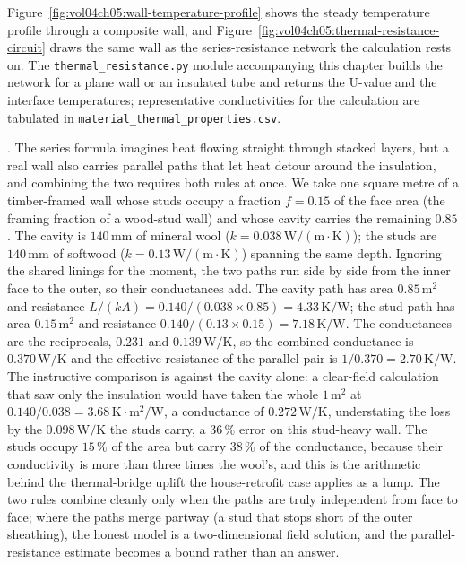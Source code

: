 



Figure~\ref{fig:vol04ch05:wall-temperature-profile} shows the steady
temperature profile through a composite wall, and
Figure~\ref{fig:vol04ch05:thermal-resistance-circuit} draws the same
wall as the series-resistance network the calculation rests on. The
\texttt{thermal\_resistance.py} module accompanying this chapter builds
the network for a plane wall or an insulated tube and returns the
U-value and the interface temperatures; representative conductivities
for the calculation are tabulated in
\texttt{material\_thermal\_properties.csv}.

. The series formula
imagines heat flowing straight through stacked layers, but a real wall
also carries parallel paths that let heat detour around the insulation, and
combining the two requires both rules at once. We take one square metre of
a timber-framed wall whose studs occupy a fraction $f = 0.15$ of the face
area (the framing fraction of a wood-stud wall) and whose cavity carries
the remaining $0.85$. The cavity is $140\,\si{\milli\meter}$ of mineral
wool ($k = 0.038\,\text{W}/(\text{m}\cdot\si{\kelvin})$); the studs are
$140\,\si{\milli\meter}$ of softwood ($k = 0.13\,\text{W}/(\text{m}\cdot
\si{\kelvin})$) spanning the same depth. Ignoring the shared linings for
the moment, the two paths run side by side from the inner face to the
outer, so their conductances add. The cavity path has area $0.85\,\text{m}^2$
and resistance $L/(kA) = 0.140/(0.038\times0.85) = 4.33\,\si{\kelvin}/
\text{W}$; the stud path has area $0.15\,\text{m}^2$ and resistance
$0.140/(0.13\times0.15) = 7.18\,\si{\kelvin}/\text{W}$. The conductances
are the reciprocals, $0.231$ and $0.139\,\text{W}/\si{\kelvin}$, so the
combined conductance is $0.370\,\text{W}/\si{\kelvin}$ and the effective
resistance of the parallel pair is $1/0.370 = 2.70\,\si{\kelvin}/\text{W}$.
The instructive comparison is against the cavity alone: a clear-field
calculation that saw only the insulation would have taken the whole
$1\,\text{m}^2$ at $0.140/0.038 = 3.68\,\si{\kelvin}\cdot\text{m}^2/
\text{W}$, a conductance of $0.272\,\text{W}/\si{\kelvin}$, understating the
loss by the $0.098\,\text{W}/\si{\kelvin}$ the studs carry, a $36\,\%$
error on this stud-heavy wall. The studs occupy $15\,\%$ of the area but
carry $38\,\%$ of the conductance, because their conductivity is more than
three times the wool's, and this is the arithmetic behind the
thermal-bridge uplift the house-retrofit case applies as a lump. The two
rules combine cleanly only when the paths are truly independent from face
to face; where the paths merge partway (a stud that stops short of the
outer sheathing), the honest model is a two-dimensional field solution, and
the parallel-resistance estimate becomes a bound rather than an answer.

